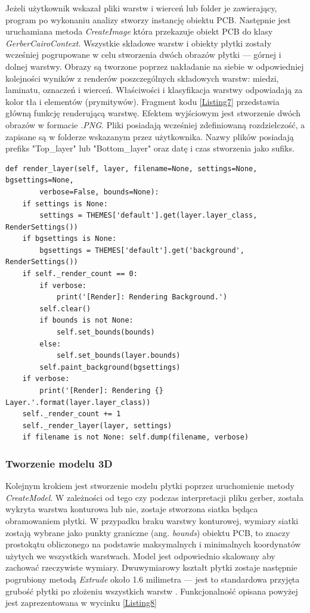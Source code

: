 \documentclass{xmgr}
\begin{document}
Jeżeli użytkownik wskazał pliki warstw i wierceń lub folder je zawierający, program po wykonaniu analizy stworzy instancję obiektu PCB. Następnie jest uruchamiana metoda \emph{CreateImage} która przekazuje obiekt PCB do klasy \emph{GerberCairoContext}. Wszystkie składowe warstw i obiekty płytki zostały wcześniej pogrupowane w celu stworzenia dwóch obrazów płytki --- górnej i dolnej warstwy. Obrazy są tworzone poprzez nakładanie na siebie w odpowiedniej kolejności wyników z renderów poszczególnych składowych warstw: miedzi, laminatu, oznaczeń i wierceń. Właściwości i klasyfikacja warstwy odpowiadają za kolor tła i elementów (prymitywów). Fragment kodu \ref{Listing7} przedstawia główną funkcję renderującą warstwę.
Efektem wyjściowym jest stworzenie dwóch obrazów w formacie \emph{.PNG}. Pliki posiadają wcześniej zdefiniowaną rozdzielczość, a zapisane są w folderze wskazanym przez użytkownika. Nazwy plików posiadają prefiks "Top\_layer" lub "Bottom\_layer" oraz datę i czas stworzenia jako sufiks. 

\begin{lstlisting}
def render_layer(self, layer, filename=None, settings=None, bgsettings=None,
		verbose=False, bounds=None):
    if settings is None:
        settings = THEMES['default'].get(layer.layer_class, RenderSettings())
    if bgsettings is None:
        bgsettings = THEMES['default'].get('background', RenderSettings())
    if self._render_count == 0:
        if verbose:
            print('[Render]: Rendering Background.')
        self.clear()
        if bounds is not None:
            self.set_bounds(bounds)
        else:
            self.set_bounds(layer.bounds)
        self.paint_background(bgsettings)
    if verbose:
        print('[Render]: Rendering {} Layer.'.format(layer.layer_class))
    self._render_count += 1
    self._render_layer(layer, settings)
    if filename is not None: self.dump(filename, verbose)
\end{lstlisting}

\subsubsection{Tworzenie modelu 3D}
Kolejnym krokiem jest stworzenie modelu płytki poprzez uruchomienie metody \emph{CreateModel}. W zależności od tego czy podczas interpretacji pliku gerber, została wykryta warstwa konturowa lub nie, zostaje stworzona siatka będąca obramowaniem płytki. W przypadku braku warstwy konturowej, wymiary siatki zostają wybrane jako punkty graniczne (ang. \emph{bounds}) obiektu PCB, to znaczy prostokątu obliczonego na podstawie maksymalnych i minimalnych koordynatów użytych we wszystkich warstwach. Model jest odpowiednio skalowany aby zachować rzeczywiste wymiary. Dwuwymiarowy kształt płytki zostaje następnie pogrubiony metodą \emph{Extrude} około 1.6 milimetra --- jest to standardowa przyjęta grubość płytki po złożeniu wszystkich warstw \cite{Khandpur}. Funkcjonalność opisana powyżej jest zaprezentowana w wycinku \ref{Listing8}
\end{document}
